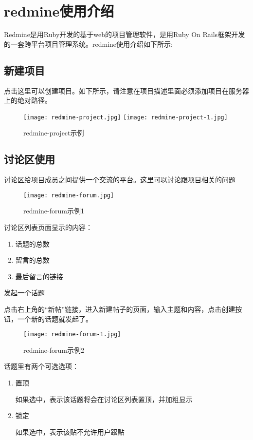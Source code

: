 \section{redmine使用介绍}

Redmine是用Ruby开发的基于web的项目管理软件，是用Ruby On Rails框架开发的一套跨平台项目管理系统。redmine使用介绍如下所示:

\subsection{新建项目}

点击这里可以创建项目。如下所示，请注意在项目描述里面必须添加项目在服务器上的绝对路径。

\begin{figure}[htpd]
 \centering
 \texttt{[image: redmine-project.jpg]}
 \centering
 \texttt{[image: redmine-project-1.jpg]}
\caption{redmine-project示例}
\end{figure}

\subsection{讨论区使用}

讨论区给项目成员之间提供一个交流的平台。这里可以讨论跟项目相关的问题

\begin{figure}[htpd]
 \centering
 \texttt{[image: redmine-forum.jpg]}
 \caption{redmine-forum示例1}
\end{figure}

讨论区列表页面显示的内容：
\begin{enumerate}
\item 话题的总数
\item 留言的总数
\item 最后留言的链接
\end{enumerate}
 
发起一个话题

点击右上角的“新帖”链接，进入新建帖子的页面，输入主题和内容，点击创建按钮，一个新的话题就发起了。
\begin{figure}[htpd]
 \centering
 \texttt{[image: redmine-forum-1.jpg]}
 \caption{ redmine-forum示例2}
\end{figure}

话题里有两个可选选项：
\begin{enumerate}
\item 置顶

如果选中，表示该话题将会在讨论区列表置顶，并加粗显示
\item 锁定

如果选中，表示该贴不允许用户跟贴
\end{enumerate}

